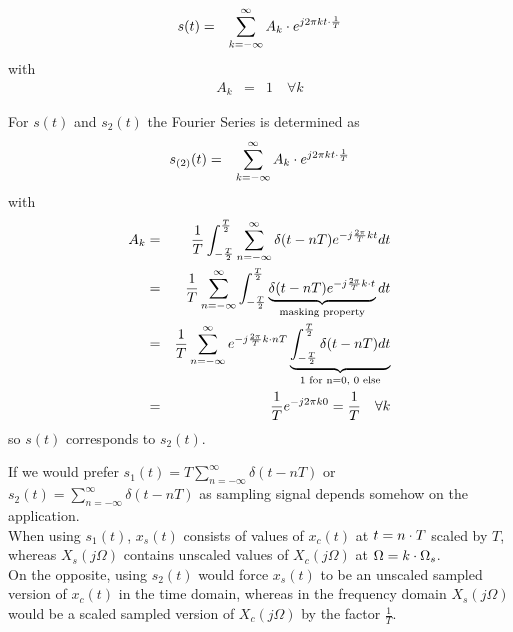 \begin{eqnarray*}
s(t) & = & \sum_{k=-\infty}^{\infty} A_k \cdot e^{j2\pi k t \cdot \frac{1}{T}}
\end{eqnarray*}
with
\begin{eqnarray*}
A_k & = & 1 \quad \forall k
\end{eqnarray*}

For $s(t)$ and $s_2(t)$ the Fourier Series is determined as
\begin{eqnarray*}
s_{(2)}(t) & = & \sum_{k=-\infty}^{\infty} A_k \cdot e^{j2\pi k t \cdot \frac{1}{T}}
\end{eqnarray*}
with
\begin{eqnarray*}
A_k & = & \frac{1}{T} \int_{-\frac{T}{2}}^{\frac{T}{2}} \sum_{n=-\infty}^{\infty} \delta (t-nT) e^{-j \frac{2\pi}{T}kt}  dt \\
& = & \frac{1}{T}  \sum_{n=-\infty}^{\infty} \int_{-\frac{T}{2}}^{\frac{T}{2}} \underbrace{\delta (t-nT) e^{-j \frac{2\pi}{T}k\cdot t}}_{\text{masking property}} dt \\
& = & \frac{1}{T} \sum_{n=-\infty}^{\infty}  e^{-j \frac{2\pi}{T}k\cdot nT} \underbrace{\int_{-\frac{T}{2}}^{\frac{T}{2}}  \delta (t-nT) dt}_{\text{1 for n=0, 0 else}} \\
& = & \frac{1}{T} e^{-j 2 \pi k 0 } = \frac{1}{T} \quad \forall k
\end{eqnarray*}
so $s(t)$ corresponds to $s_2(t)$.

If we would prefer $s_1(t) = T \sum_{n=-\infty}^{\infty} \delta (t-nT)$ or $s_2(t) = \sum_{n=-\infty}^{\infty} \delta (t-nT)$ as sampling signal depends somehow on the application.\\
When using $s_1(t)$, $x_s(t)$ consists of values of $x_c(t)$ at $t=n \cdot T$ scaled by $T$, whereas $X_s(j\Omega)$ contains unscaled values of $X_c(j\Omega)$ at $\Omega = k \cdot \Omega_s$.\\
On the opposite, using $s_2(t)$ would force $x_s(t)$ to be an unscaled sampled version of $x_c(t)$ in the time domain, whereas in the frequency domain $X_s(j\Omega)$ would be a scaled sampled version of $X_c(j\Omega)$ by the factor $\frac{1}{T}$.
